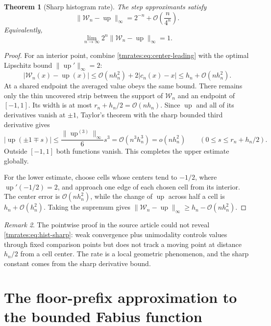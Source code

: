 \documentclass[11pt,oneside]{article}
\newtheorem{theorem}{Theorem}[section]
\theoremstyle{definition}
\theoremstyle{remark}
\newtheorem{remark}[theorem]{Remark}
\newcommand{\Up}{\operatorname{up}}
\newcommand{\bigO}{\mathcal O}
\newcommand{\smallo}{o}
\begin{document}
\begin{theorem}[Sharp histogram rate]
\label{tmrates:thm:hist-sharp}
The step approximants satisfy
\begin{equation}
 \|\mathcal W_n-\Up\|_\infty
 =2^{-n}+\bigO\!\left(\frac n{4^n}\right).                \label{tmrates:eq:hist-sharp}
\end{equation}
Equivalently,
\begin{equation}
 \lim_{n\to\infty}2^n\|\mathcal W_n-\Up\|_\infty=1.      \label{tmrates:eq:hist-limit-constant}
\end{equation}
\end{theorem}

\begin{proof}
For an interior point, combine \eqref{tmrates:eq:center-leading} with the optimal Lipschitz bound
$\|\Up'\|_\infty=2$:
\[
 |\mathcal W_n(x)-\Up(x)|
 \le \bigO(nh_n^2)+2|c_n(x)-x|
 \le h_n+\bigO(nh_n^2).
\]
At a shared endpoint the averaged value obeys the same bound.  There remains only the thin
uncovered strip between the support of $\mathcal W_n$ and an endpoint of $[-1,1]$.
Its width is at most $r_n+h_n/2=\bigO(nh_n)$.  Since $\Up$ and all of its
derivatives vanish at $\pm1$, Taylor's theorem with the sharp bounded third derivative gives
\[
 |\Up(\pm1\mp s)|\le \frac{\|\Up^{(3)}\|_\infty}{6}s^3
 =\bigO(n^3h_n^3)=\smallo(nh_n^2)
 \qquad(0\le s\le r_n+h_n/2).
\]
Outside $[-1,1]$ both functions vanish.  This completes the upper estimate globally.

For the lower estimate, choose cells whose centers tend to $-1/2$, where
$\Up'(-1/2)=2$, and approach one edge of each chosen cell from its interior.  The center error
is $\bigO(nh_n^2)$, while the change of $\Up$ across half a cell is
$h_n+\bigO(h_n^2)$.  Taking the supremum gives
$\|\mathcal W_n-\Up\|_\infty\ge h_n-\bigO(nh_n^2)$.
\end{proof}

\begin{remark}
The pointwise proof in the source article could not reveal \eqref{tmrates:eq:hist-sharp}: weak
convergence plus unimodality controls values through fixed comparison points but does not
track a moving point at distance $h_n/2$ from a cell center.  The rate is a local geometric
phenomenon, and the sharp constant comes from the sharp derivative bound.
\end{remark}

\section{The floor-prefix approximation to the bounded Fabius function}
\label{tmrates:sec:floor-rate}
\end{document}
